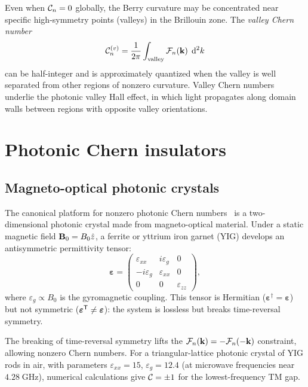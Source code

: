 Even when $\mathcal{C}_n = 0$ globally, the Berry curvature may be
concentrated near specific high-symmetry points (valleys) in the
Brillouin zone. The \emph{valley Chern number}
\begin{equation}
 \mathcal{C}_n^{(v)} = \frac{1}{2\pi}
 \int_{\text{valley}}\mathcal{F}_n(\mathbf{k})\;\mathop{}\!\mathrm{d}^2 k
 \label{eq:valley-chern}
\end{equation}
can be half-integer and is approximately quantized when the valley
is well separated from other regions of nonzero curvature. Valley
Chern numbers underlie the photonic valley Hall effect, in which light
propagates along domain walls between regions with opposite valley
orientations.

\section{Photonic Chern insulators}
\label{sec:photonic-chern}

\subsection{Magneto-optical photonic crystals}
\label{ssec:magneto-optical}

The canonical platform for nonzero photonic Chern numbers~\cite{haldane2008possible,wang2009observation,hafezi2013imaging,haldane2008reflection} is a
two-dimensional photonic crystal made from magneto-optical material.
Under a static magnetic field $\mathbf{B}_0 = B_0\hat{z}$, a ferrite or
yttrium iron garnet (YIG) develops an antisymmetric permittivity tensor:
\begin{equation}
 \boldsymbol{\varepsilon} = \begin{pmatrix}
 \varepsilon_{xx} & i\varepsilon_g & 0 \\
 -i\varepsilon_g & \varepsilon_{xx} & 0 \\
 0 & 0 & \varepsilon_{zz}
 \end{pmatrix},
 \label{eq:magneto-optical-eps}
\end{equation}
where $\varepsilon_g \propto B_0$ is the gyromagnetic coupling. This
tensor is Hermitian ($\boldsymbol{\varepsilon}^\dagger =
\boldsymbol{\varepsilon}$) but not symmetric
($\boldsymbol{\varepsilon}^{\mathsf{T}} \neq \boldsymbol{\varepsilon}$):
the system is lossless but breaks time-reversal symmetry.

The breaking of time-reversal symmetry lifts the $\mathcal{F}_n(\mathbf{k}) =
-\mathcal{F}_n(-\mathbf{k})$ constraint, allowing nonzero Chern numbers. For a
triangular-lattice photonic crystal of YIG rods in air, with parameters
$\varepsilon_{xx} = 15$, $\varepsilon_g = 12.4$ (at microwave
frequencies near $4.28\;\mathrm{GHz}$), numerical calculations give
$\mathcal{C} = \pm 1$ for the lowest-frequency TM gap.

